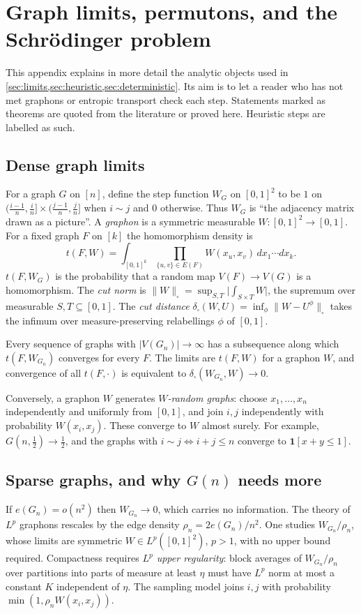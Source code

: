 \section{Graph limits, permutons, and the Schr\"odinger problem}\label{app:limits}

This appendix explains in more detail the analytic objects used in
\cref{sec:limits,sec:heuristic,sec:deterministic}. Its aim is to let a reader who has not
met graphons or entropic transport check each step. Statements marked as theorems are
quoted from the literature or proved here. Heuristic steps are labelled as such.

\subsection{Dense graph limits}
For a graph $G$ on $[n]$, define the step function $W_G$ on $[0,1]^2$ to be $1$ on
$\bigl(\frac{i-1}n,\frac in\bigr]\times\bigl(\frac{j-1}n,\frac jn\bigr]$ when $i\sim j$ and
$0$ otherwise. Thus $W_G$ is ``the adjacency matrix drawn as a picture''. A
\emph{graphon} is a symmetric measurable $W:[0,1]^2\to[0,1]$. For a fixed graph $F$
on $[k]$ the homomorphism density is
\[
t(F,W)=\int_{[0,1]^k}\prod_{\{u,v\}\in E(F)}W(x_u,x_v)\,dx_1\cdots dx_k .
\]
$t(F,W_G)$ is the probability that a random map $V(F)\to V(G)$ is a homomorphism. The
\emph{cut norm} is $\|W\|_\square=\sup_{S,T}\bigl|\int_{S\times T}W\bigr|$, the supremum
over measurable $S,T\subseteq[0,1]$. The \emph{cut distance}
$\delta_\square(W,U)=\inf_\phi\|W-U^\phi\|_\square$ takes the infimum over
measure-preserving relabellings $\phi$ of $[0,1]$.

\begin{theorem}
Every sequence of graphs with $|V(G_n)|\to\infty$ has a subsequence along which
$t(F,W_{G_n})$ converges for every $F$. The limits are $t(F,W)$ for a graphon $W$, and
convergence of all $t(F,\cdot)$ is equivalent to $\delta_\square(W_{G_n},W)\to0$.
\end{theorem}

Conversely, a graphon $W$ generates \emph{$W$-random graphs}: choose
$x_1,\dots,x_n$ independently and uniformly from $[0,1]$, and join $i,j$ independently with
probability $W(x_i,x_j)$. These converge to $W$ almost surely. For example,
$G(n,\tfrac12)\to\tfrac12$, and the graphs with $i\sim j\iff i+j\le n$ converge to
$\mathbf 1[x+y\le1]$.

\subsection{Sparse graphs, and why $G(n)$ needs more}
If $e(G_n)=o(n^2)$ then $W_{G_n}\to0$, which carries no information. The theory of $L^p$
graphons \cite{BCCZ1,BCCZ2} rescales by the edge density $\rho_n=2e(G_n)/n^2$. One
studies $W_{G_n}/\rho_n$, whose limits are symmetric $W\in L^p([0,1]^2)$, $p>1$, with no
upper bound required. Compactness requires \emph{$L^p$ upper regularity}: block averages of
$W_{G_n}/\rho_n$ over partitions into parts of measure at least $\eta$ must have $L^p$ norm
at most a constant $K$ independent of $\eta$. The sampling model joins $i,j$ with
probability $\min(1,\rho_nW(x_i,x_j))$.

